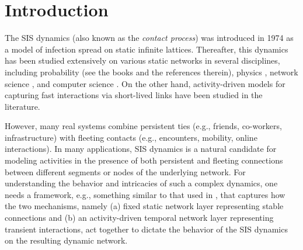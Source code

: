\documentclass[pdflatex,sn-mathphys-num]{sn-jnl}%
\theoremstyle{thmstyleone}%
\theoremstyle{thmstyletwo}%
\theoremstyle{thmstylethree}%
\begin{document}


\maketitle

\section{Introduction}\label{sec:introduction}

The SIS dynamics (also known as the \emph{contact process}) was introduced in 1974 \cite{harris1974contact} as a model of infection spread on static infinite lattices. Thereafter, this dynamics has been studied extensively on various static networks in several disciplines, including probability (see the books \cite{liggett2013stochastic,durrett2010random} and the references therein), physics \cite{pastor2001epidemic,pastor2002epidemic,PSV2015}, network science \cite{gomez2008spreading}, and computer science \cite{Wang2003,Chakrabarti2008,VanMieghem2009}. 
On the other hand, activity-driven models for capturing fast interactions via short-lived links \cite{Perra2012,HolmeSaramaki2012} have been studied in the literature.

However, many real systems combine persistent ties (e.g., friends, co-workers, infrastructure) with fleeting contacts (e.g., encounters, mobility, online interactions). In many applications, SIS dynamics is a natural candidate for modeling activities in the presence of both persistent and fleeting connections between different segments or nodes of the underlying network.  For understanding the behavior and intricacies of such a complex dynamics, one needs a framework, e.g., something similar to that used in  \cite{Valdano2015}, that captures how the two mechanisms, namely (a) fixed static network layer representing stable connections and (b) an activity-driven temporal network layer representing transient interactions, act together to dictate the behavior of the SIS dynamics on the resulting dynamic network.
\end{document}
